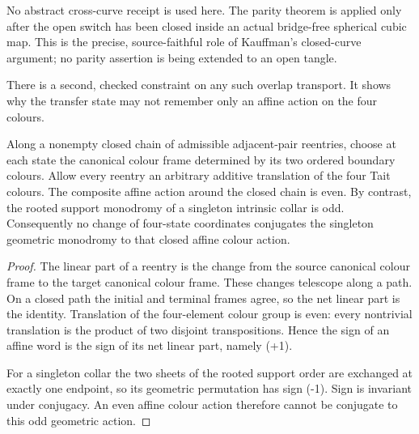 No abstract cross-curve receipt is used here.  The parity theorem is applied
only after the open switch has been closed inside an actual bridge-free
spherical cubic map.  This is the precise, source-faithful role of Kauffman's
closed-curve argument; no parity assertion is being extended to an open
tangle.

There is a second, checked constraint on any such overlap transport.  It
shows why the transfer state may not remember only an affine action on the
four colours.

\begin{lemma}
\label{lem:singleton-collar-affine-parity}
Along a nonempty closed chain of admissible adjacent-pair reentries, choose
at each state the canonical colour frame determined by its two ordered
boundary colours.  Allow every reentry an arbitrary additive translation of
the four Tait colours.  The composite affine action around the closed chain
is even.  By contrast, the rooted support monodromy of a singleton intrinsic
collar is odd.  Consequently no change of four-state coordinates conjugates
the singleton geometric monodromy to that closed affine colour action.

\end{lemma}

\begin{proof}
The linear part of a reentry is the change from the source canonical colour
frame to the target canonical colour frame.  These changes telescope along
a path.  On a closed path the initial and terminal frames agree, so the net
linear part is the identity.  Translation of the four-element colour group
is even: every nontrivial translation is the product of two disjoint
transpositions.  Hence the sign of an affine word is the sign of its net
linear part, namely (+1).

For a singleton collar the two sheets of the rooted support order are
exchanged at exactly one endpoint, so its geometric permutation has sign
(-1).  Sign is invariant under conjugacy.  An even affine colour action
therefore cannot be conjugate to this odd geometric action.
\end{proof}

